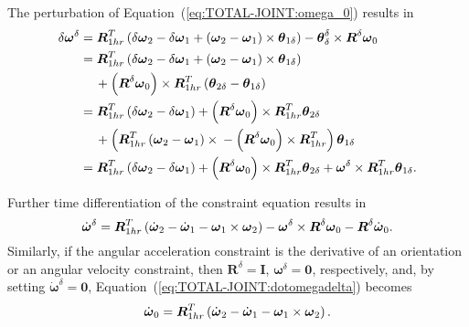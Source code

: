 \documentclass[10pt,dvips,fleqn,subeqn]{report}
\newcommand{\T}[1]{\boldsymbol{#1}}
\begin{document}
The perturbation of Equation~(\ref{eq:TOTAL-JOINT:omega_0}) results in
\begin{align}
	\delta\T{\omega}^{\delta}
	&= \T{R}_{1hr}^T \plbr{
		\delta\T{\omega}_2
		- \delta\T{\omega}_1
		+ \plbr{\T{\omega}_2 - \T{\omega}_1}\times\T{\theta}_{1\delta}
	} - \T{\theta}_{\delta}^{\delta}\times\T{R}^{\delta}\T{\omega}_0 \nonumber \\
	&= \T{R}_{1hr}^T \plbr{
		\delta\T{\omega}_2
		- \delta\T{\omega}_1
		+ \plbr{\T{\omega}_2 - \T{\omega}_1}\times\T{\theta}_{1\delta}
	} \nonumber \\
	& \mbox{\hspace{12pt}}
	+ \plbr{\T{R}^{\delta}\T{\omega}_0}\times \T{R}_{1hr}^T \plbr{
		\T{\theta}_{2\delta}
		- \T{\theta}_{1\delta}
	} \nonumber \\
	&= \T{R}_{1hr}^T \plbr{
		\delta\T{\omega}_2
		- \delta\T{\omega}_1
	} + \plbr{\T{R}^{\delta}\T{\omega}_0}\times \T{R}_{1hr}^T \T{\theta}_{2\delta}
	\nonumber \\
	& \mbox{\hspace{12pt}}
	+ \plbr{
		\T{R}_{1hr}^T \plbr{\T{\omega}_2 - \T{\omega}_1}\times{}
		- \plbr{\T{R}^{\delta}\T{\omega}_0}\times \T{R}_{1hr}^T
	} \T{\theta}_{1\delta}
	\nonumber \\
	&= \T{R}_{1hr}^T \plbr{
		\delta\T{\omega}_2
		- \delta\T{\omega}_1
	} + \plbr{\T{R}^{\delta}\T{\omega}_0}\times \T{R}_{1hr}^T \T{\theta}_{2\delta}
	+ \T{\omega}^{\delta} \times \T{R}_{1hr}^T \T{\theta}_{1\delta} .
\end{align}

Further time differentiation of the constraint equation results in
\begin{equation}
	\dot{\T{\omega}}^{\delta}
	= \T{R}_{1hr}^T\plbr{
		\dot{\T{\omega}}_2
		- \dot{\T{\omega}}_1
		- \T{\omega}_1 \times \T{\omega}_2
	} - \T{\omega}^{\delta} \times \T{R}^{\delta} \T{\omega}_0
	- \T{R}^{\delta} \dot{\T{\omega}}_0 .
	\label{eq:TOTAL-JOINT:dotomegadelta}
\end{equation}
Similarly, if the angular acceleration constraint 
is the derivative of an orientation or an angular velocity constraint,
then $\T{R}^{\delta}=\T{I}$, $\T{\omega}^{\delta}=\T{0}$, respectively,
and, by setting $\dot{\T{\omega}}^{\delta}=\T{0}$,
Equation~(\ref{eq:TOTAL-JOINT:dotomegadelta}) becomes
\begin{equation}
	\dot{\T{\omega}}_0 = \T{R}_{1hr}^T\plbr{
		\dot{\T{\omega}}_2
		- \dot{\T{\omega}}_1
		- \T{\omega}_1 \times \T{\omega}_2
	} .
\end{equation}
\end{document}
